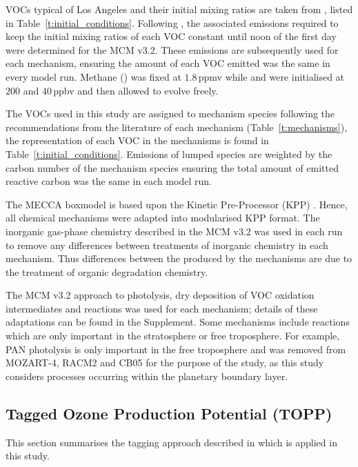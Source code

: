 \documentclass[acpd, online, hvmath]{copernicus}
\begin{document}
VOCs typical of Los Angeles and their initial mixing ratios are taken
from \citet{Baker:2008}, listed in Table~\ref{t:initial_conditions}.
Following \citet{Butler:2011}, the associated emissions required to
keep the initial mixing ratios of each VOC constant until noon of the
first day were determined for the MCM v3.2.  These emissions are
subsequently used for each mechanism, ensuring the amount of each VOC
emitted was the same in every model run.  Methane () was
fixed at $1.8$\,\unit{ppmv} while  and  were
initialised at $200$ and $40$\,\unit{ppbv} and then
allowed to evolve freely.

The VOCs used in this study are assigned to mechanism species
following the recommendations from the literature of each mechanism
(Table~\ref{t:mechanisms}), the representation of each VOC in the
mechanisms is found in Table~\ref{t:initial_conditions}.  Emissions of
lumped species are weighted by the carbon number of the mechanism
species ensuring the total amount of emitted reactive carbon was the
same in each model run.

The MECCA boxmodel is based upon the Kinetic Pre-Processor (KPP)
\citep{Damian:2002}.  Hence, all chemical mechanisms were adapted into
modularised KPP format.  The inorganic gas-phase chemistry described
in the MCM v3.2 was used in each run to remove any differences between
treatments of inorganic chemistry in each mechanism.  Thus differences
between the  produced by the mechanisms are due to the
treatment of organic degradation chemistry.

The MCM v3.2 approach to photolysis, dry deposition of VOC oxidation
intermediates and  reactions was used for each
mechanism; details of these adaptations can be found in the Supplement.  Some mechanisms include reactions which are
only important in the stratosphere or free troposphere.  For example,
PAN photolysis is only important in the free troposphere
\citep{Harwood:2003} and was removed from MOZART-4, RACM2 and CB05 for
the purpose of the study, as this study considers processes occurring
within the planetary boundary layer.


\subsection{Tagged Ozone Production Potential (TOPP)}

This section summarises the tagging approach described in \citet{Butler:2011} which is applied in this study.
\end{document}
